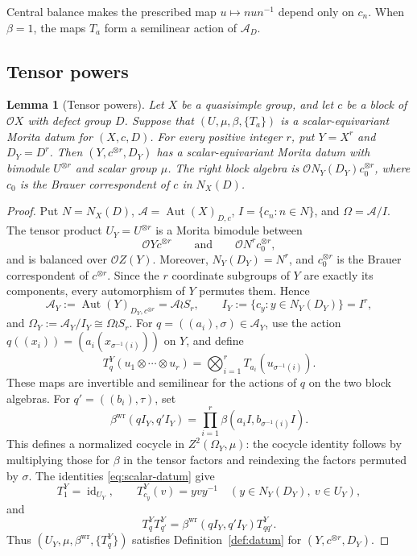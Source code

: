\documentclass[11pt,a4paper]{article}
\newtheorem{lemma}[theorem]{Lemma}
\theoremstyle{definition}
\theoremstyle{remark}
\numberwithin{equation}{section}
\newcommand{\cO}{\mathcal{O}}
\DeclareMathOperator{\Aut}{Aut}
\DeclareMathOperator{\id}{id}
\begin{document}
	Central balance makes the prescribed map $u\mapsto nun^{-1}$ depend only
	on $c_n$. When $\beta=1$, the maps $T_a$ form a semilinear action of
	$\mathcal A_D$.
	
	\subsection{Tensor powers}
	
	\begin{lemma}[Tensor powers]\label{lem:tensor-datum}
		Let $X$ be a quasisimple group, and let $c$ be a block of $\cO X$
		with defect group $D$. Suppose that $(U,\mu,\beta,\{T_a\})$ is a
		scalar-equivariant Morita datum for $(X,c,D)$.
		For every positive integer $r$, put $Y=X^r$ and $D_Y=D^r$.
		Then $(Y,c^{\otimes r},D_Y)$ has a scalar-equivariant Morita datum
		with bimodule $U^{\otimes r}$ and scalar group $\mu$.
		The right block algebra is
		$\cO N_Y(D_Y)c_0^{\otimes r}$, where $c_0$ is the Brauer
		correspondent of $c$ in $N_X(D)$.
	\end{lemma}
	
	\begin{proof}
		Put $N=N_X(D)$,
		$\mathcal A=\Aut(X)_{D,c}$, $I=\{c_n:n\in N\}$, and
		$\Omega=\mathcal A/I$. The tensor product $U_Y=U^{\otimes r}$
		is a Morita bimodule between
		\[
		\cO Yc^{\otimes r}\qquad\text{and}\qquad
		\cO N^r c_0^{\otimes r},
		\]
		and is balanced over $\cO Z(Y)$. Moreover,
		$N_Y(D_Y)=N^r$, and $c_0^{\otimes r}$ is the Brauer
		correspondent of $c^{\otimes r}$.
		Since the $r$ coordinate subgroups of $Y$ are exactly its components,
		every automorphism of $Y$ permutes them. Hence
		\[
		\mathcal A_Y:=\Aut(Y)_{D_Y,c^{\otimes r}}
		=\mathcal A\wr S_r,\qquad
		I_Y:=\{c_y:y\in N_Y(D_Y)\}=I^r,
		\]
		and $\Omega_Y:=\mathcal A_Y/I_Y\cong\Omega\wr S_r$.
		For $q=((a_i),\sigma)\in\mathcal A_Y$, use the action
		$q((x_i))=(a_i(x_{\sigma^{-1}(i)}))$ on $Y$, and define
		\[
		T^Y_q(u_1\otimes\cdots\otimes u_r)
		=\bigotimes_{i=1}^r T_{a_i}(u_{\sigma^{-1}(i)}).
		\]
		These maps are invertible and semilinear for the actions of $q$
		on the two block algebras.
		For $q'=((b_i),\tau)$, set
		\begin{equation}\label{eq:wreath-multiplier}
			\beta^{\mathrm{wr}}(qI_Y,q'I_Y)
			=\prod_{i=1}^r\beta(a_iI,b_{\sigma^{-1}(i)}I).
		\end{equation}
		This defines a normalized cocycle in $Z^2(\Omega_Y,\mu)$:
		the cocycle identity follows by multiplying those for $\beta$ in
		the tensor factors and reindexing the factors permuted by $\sigma$.
		The identities \eqref{eq:scalar-datum} give
		\[
		T^Y_1=\id_{U_Y},\qquad
		T^Y_{c_y}(v)=yvy^{-1}\quad(y\in N_Y(D_Y),\ v\in U_Y),
		\]
		and
		\[
		T^Y_qT^Y_{q'}
		=\beta^{\mathrm{wr}}(qI_Y,q'I_Y)T^Y_{qq'}.
		\]
		Thus $(U_Y,\mu,\beta^{\mathrm{wr}},\{T^Y_q\})$ satisfies
		Definition~\ref{def:datum} for $(Y,c^{\otimes r},D_Y)$.
	\end{proof}
	
\end{document}
